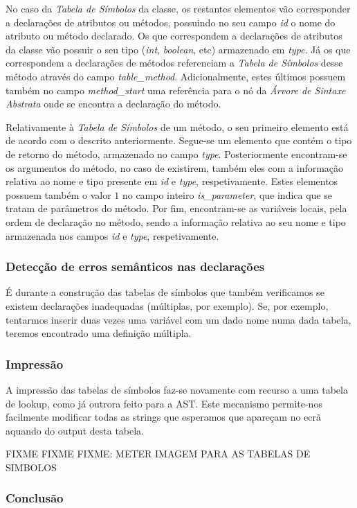 \documentclass[11pt,a4paper]{article}
\begin{document}
	No caso da \emph{Tabela de Símbolos} da classe, os restantes elementos vão corresponder a declarações de atributos ou métodos, possuindo no seu campo \emph{id} o nome do atributo ou método declarado. Os que correspondem a declarações de atributos da classe vão possuir o seu tipo (\emph{int}, \emph{boolean}, etc) armazenado em \emph{type}. Já os que correspondem a declarações de métodos referenciam a \emph{Tabela de Símbolos} desse método através do campo  \emph{table\_method}. Adicionalmente, estes últimos possuem também no campo \emph{method\_start} uma referência para o nó da \emph{Árvore de Sintaxe Abstrata} onde se encontra a declaração do método.
	
	Relativamente à \emph{Tabela de Símbolos} de um método, o seu primeiro elemento está de acordo com o descrito anteriormente. Segue-se um elemento que contém o tipo de retorno do método, armazenado no campo \emph{type}. Posteriormente encontram-se os argumentos do método, no caso de existirem, também eles com a informação relativa ao nome e tipo presente em \emph{id} e \emph{type}, respetivamente. Estes elementos possuem também o valor $1$ no campo inteiro \emph{is\_parameter}, que indica que se tratam de parâmetros do método. Por fim, encontram-se as variáveis locais, pela ordem de declaração no método, sendo a informação relativa ao seu nome e tipo armazenada nos campos \emph{id} e \emph{type}, respetivamente.

	\subsubsection{Detecção de erros semânticos nas declarações}
	É durante a construção das tabelas de símbolos que também verificamos se existem declarações inadequadas (múltiplas, por exemplo). Se, por exemplo, tentarmos inserir duas vezes uma variável com um dado nome numa dada tabela, teremos encontrado uma definição múltipla.

	\subsubsection{Impressão}
	A impressão das tabelas de símbolos faz-se novamente com recurso a uma tabela de lookup, como já outrora feito para a AST. Este mecanismo permite-nos facilmente modificar todas as strings que esperamos que apareçam no ecrã aquando do output desta tabela.
	
	FIXME FIXME FIXME: METER IMAGEM PARA AS TABELAS DE SIMBOLOS
	
	\subsubsection{Conclusão}
	
\end{document}
